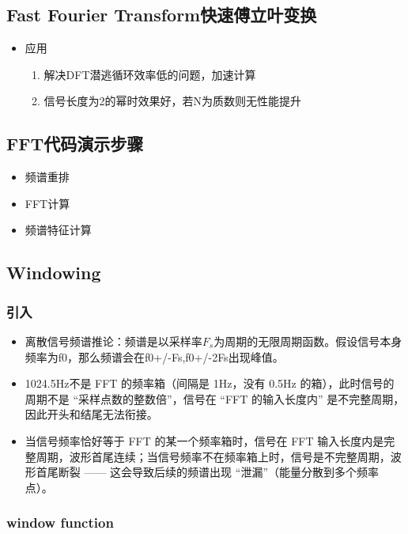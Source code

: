 \documentclass[UTF8]{ctexart}
\begin{document}
\subsection{Fast Fourier Transform快速傅立叶变换}
\begin{itemize}
    \item 应用
    \begin{enumerate}
        \item 解决DFT潜逃循环效率低的问题，加速计算
        \item 信号长度为2的幂时效果好，若N为质数则无性能提升
    \end{enumerate}
\end{itemize}

\subsection{FFT代码演示步骤}
\begin{itemize}
    \item 频谱重排
    \item FFT计算
    \item 频谱特征计算
\end{itemize}

\subsection{Windowing}
\subsubsection{引入}
\begin{itemize}
    \item 离散信号频谱推论：频谱是以采样率$F_s$为周期的无限周期函数。假设信号本身频率为f0，那么频谱会在f0+/-Fs,f0+/-2Fs出现峰值。
    \item 1024.5Hz不是 FFT 的频率箱（间隔是 1Hz，没有 0.5Hz 的箱），此时信号的周期不是 “采样点数的整数倍”，信号在 “FFT 的输入长度内” 是不完整周期，因此开头和结尾无法衔接。
    \item 当信号频率恰好等于 FFT 的某一个频率箱时，信号在 FFT 输入长度内是完整周期，波形首尾连续；当信号频率不在频率箱上时，信号是不完整周期，波形首尾断裂 —— 这会导致后续的频谱出现 “泄漏”（能量分散到多个频率点）。
\end{itemize}

\subsubsection{window function}
\end{document}
